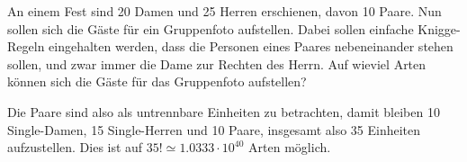 An einem Fest sind 20 Damen und 25 Herren erschienen, davon
10 Paare. Nun sollen sich die Gäste für ein Gruppenfoto aufstellen.
Dabei sollen einfache Knigge-Regeln eingehalten werden, dass
die Personen eines Paares nebeneinander stehen sollen, und zwar immer
die Dame zur Rechten des Herrn. Auf wieviel Arten können sich
die Gäste für das Gruppenfoto aufstellen?

\begin{loesung}
Die Paare sind also als untrennbare Einheiten zu betrachten, damit
bleiben 10 Single-Damen, 15 Single-Herren und 10 Paare,
insgesamt also 35 Einheiten aufzustellen.
Dies ist auf $35!\simeq 1.0333\cdot 10^{40}$ Arten möglich.
\end{loesung}

